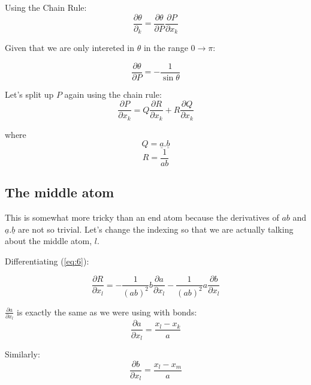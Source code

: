\documentclass[a4paper,twocolumn,9pt]{article}
\begin{document}
Using the Chain Rule:
\begin{equation}
  \label{eq:2}
  \frac{\partial \theta}{\partial _k} = \frac{\partial \theta}{\partial P} \frac{\partial P}{\partial x_k}
\end{equation}

Given that we are only intereted in $\theta$ in the range $0\rightarrow\pi$:

\begin{equation}
  \label{eq:3}
  \frac{\partial \theta}{\partial P} = -\frac{1}{\sin \theta}
\end{equation}

Let's split up $P$ again using the chain rule: 
\begin{equation}
  \label{eq:4}
  \frac{\partial P}{\partial x_k} = 
  Q\frac{\partial R}{\partial x_k} + R\frac{\partial Q}{\partial x_k}
\end{equation}

where 
\begin{equation}
  \label{eq:5}
  Q =  {\underline a}.{\underline b}
\end{equation}
\begin{equation}
  \label{eq:6}
  R = \frac{1}{ab}
\end{equation}

\subsection{The middle atom}

This is somewhat more tricky than an end atom because the derivatives
of $ab$ and ${\underline a}.{\underline b}$ are not so trivial.  Let's
change the indexing so that we are actually talking about the middle
atom, $l$.

Differentiating (\ref{eq:6}): 

\begin{equation}
  \label{eq:7}
  \frac{\partial R}{\partial x_l} = 
  -\frac{1}{(ab)^2}b\frac{\partial a}{\partial x_l} 
  -\frac{1}{(ab)^2}a\frac{\partial b}{\partial x_l}
\end{equation}

$\frac{\partial a}{\partial x_l}$ is exactly the same as we were using
with bonds:
\begin{displaymath}
  \frac{\partial a}{\partial x_l} = \frac{x_l-x_k}{a}
\end{displaymath}

Similarly:
\begin{displaymath}
  \frac{\partial b}{\partial x_l} = \frac{x_l-x_m}{a}
\end{displaymath}
\end{document}
